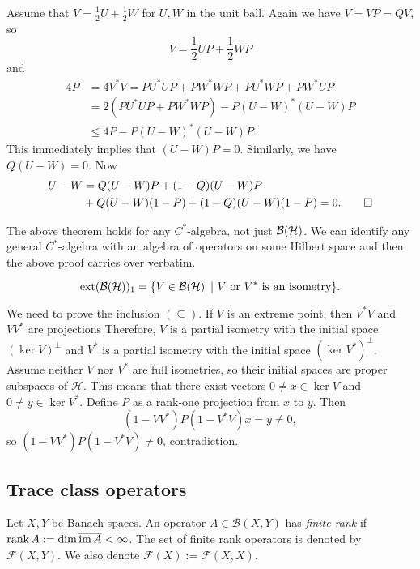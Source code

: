 \begin{myproof}
  Assume that $V = \frac{1}{2} U + \frac{1}{2} W$ for $U, W$ in the unit ball. 
  Again we have $V = VP = QV$, so $$V = \frac{1}{2} UP + \frac{1}{2} WP$$ and 
  \begin{align*}
    4 P &= 4 V^* V = P U^* U P + PW^* WP + P U^* W P + P W^* U P\\
    &= 2 (P U^* U P + PW^* WP) - P (U - W)^* (U - W) P\\
    &\leq 4P - P (U - W)^* (U - W) P.
  \end{align*} 
  This immediately implies that $(U - W)P = 0$. Similarly, we have $ Q(U - W) = 0.$ Now 
  \begin{align*}
    U - W &= Q (U - W) P + (1 - Q) (U - W) P \\
    &+ Q (U - W) (1 - P) + (1 - Q) (U - W) (1 - P) = 0. \qedhere
  \end{align*}
\end{myproof}

\begin{remark}
  The above theorem holds for any $C^*$-algebra, not just $\operatorname{\mathcal{B} (\mathcal{H})}$.
  We can identify any general $C^*$-algebra with an algebra of operators on some Hilbert space
  and then the above proof carries over verbatim. 
\end{remark}

\begin{corollary}\label{cor:4.1}
  $$\operatorname{ext} (\operatorname{\mathcal{B} (\mathcal{H})})_1 = \{V \in \operatorname{\mathcal{B} (\mathcal{H})}\ |\ \textrm{$V$ or $V^*$ is an isometry}\}.$$
\end{corollary}

\begin{myproof}
  We need to prove the inclusion $(\subseteq)$. If $V$ is an extreme point, then $V^* V$ and $V V^*$ are projections
  Therefore, $V$ is a partial isometry with the initial space $(\ker V)^\perp$ and 
  $V^*$ is a partial isometry with the initial space $(\ker V^*)^\perp$.
  Assume neither $V$ nor $V^*$ are full isometries, so their initial spaces are proper subspaces of $\mathcal{H}$.
  This means that there exist vectors $0 \neq x \in \ker V$ and $0 \neq y \in \ker V^*$.
  Define $P$ as a rank-one projection from $x$ to $y$. Then
  $$(1 - V V^*) P (1 - V^* V) x = y \neq 0,$$
  so $(1 - V V^*) P (1 - V^* V) \neq 0$, contradiction.
\end{myproof}

\subsection{Trace class operators}

\begin{definition}
  Let $X, Y$ be Banach spaces.
  An operator $A \in \mathcal{B} (X, Y)$ has \emph{finite rank} if $\operatorname{rank} A := \dim \overline{\operatorname{im} A} < \infty$.
  The set of finite rank operators is denoted by $\mathcal{F} (X, Y)$.
  We also denote $\mathcal{F} (X) := \mathcal{F} (X, X)$.
\end{definition}

